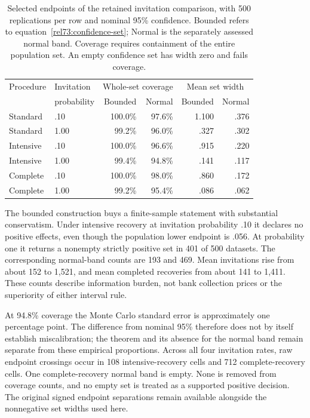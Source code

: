\begin{table}[htbp]
\centering\small
\begin{tabular}{llrrrr}
\toprule
Procedure & Invitation & \multicolumn{2}{c}{Whole-set coverage}
 & \multicolumn{2}{c}{Mean set width}\\
 & probability & Bounded & Normal & Bounded & Normal\\
\midrule
Standard & .10 & 100.0\% & 97.6\% & 1.100 & .376\\
Standard & 1.00 & 99.2\% & 96.0\% & .327 & .302\\
Intensive & .10 & 100.0\% & 96.6\% & .915 & .220\\
Intensive & 1.00 & 99.4\% & 94.8\% & .141 & .117\\
Complete & .10 & 100.0\% & 98.0\% & .860 & .172\\
Complete & 1.00 & 99.2\% & 95.4\% & .086 & .062\\
\bottomrule
\end{tabular}
\caption{Selected endpoints of the retained invitation comparison, with
500 replications per row and nominal 95\% confidence. Bounded refers to
equation~\eqref{rel73:confidence-set}; Normal is the separately assessed
normal band. Coverage requires containment of the entire population set.
An empty confidence set has width zero and fails coverage.}
\label{rel73:coverage}
\end{table}

The bounded construction buys a finite-sample statement with substantial
conservatism. Under intensive recovery at invitation probability .10 it
declares no positive effects, even though the population lower endpoint is
.056. At probability one it returns a nonempty strictly positive set in
401 of 500 datasets. The corresponding normal-band counts are 193 and
469. Mean invitations rise from about 152 to 1,521, and mean completed
recoveries from about 141 to 1,411. These counts describe information burden,
not bank collection prices or the superiority of either interval rule.

At 94.8\% coverage the Monte Carlo standard error is approximately one
percentage point. The difference from nominal 95\% therefore does not by
itself establish miscalibration; the theorem and its absence for the normal
band remain separate from these empirical proportions. Across all four
invitation rates, raw endpoint crossings occur in 108 intensive-recovery
cells and 712 complete-recovery cells. One complete-recovery normal band is
empty. None is removed from coverage counts, and no empty set is treated
as a supported positive decision. The original signed endpoint separations
remain available alongside the nonnegative set widths used here.


